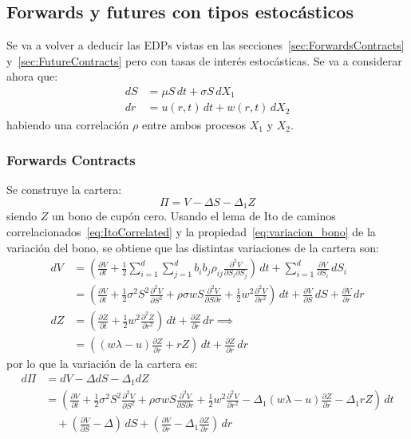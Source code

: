 \subsection{Forwards y futures con tipos estocásticos}
Se va a volver a deducir las EDPs vistas en las secciones~\ref{sec:ForwardsContracts} y~\ref{sec:FutureContracts} pero con tasas de interés estocásticas. Se va a considerar ahora que:
\begin{align*}
    dS &= \mu S\,dt + \sigma S\,dX_1 \\[1.5em]
    dr &= u(r,t)\,dt + w(r,t)\,dX_2
\end{align*}
habiendo una correlación $\rho$ entre ambos procesos $X_1$ y $X_2$.


\subsubsection{Forwards Contracts}
Se construye la cartera:
\begin{equation*}
    \Pi = V - \Delta S - \Delta_1 Z
\end{equation*}
siendo $Z$ un bono de cupón cero. Usando el lema de Ito de caminos correlacionados~\eqref{eq:ItoCorrelated} y la propiedad~\eqref{eq:variacion_bono} de la variación del bono, se obtiene que las distintas variaciones de la cartera son:
\begin{align*}
    dV &= \left( \frac{\partial V}{\partial t} + \frac{1}{2} \sum_{i=1}^{d} \sum_{j=1}^{d} b_i b_j \rho_{ij} \frac{\partial^2 V}{\partial S_i \partial S_j} \right)\,dt + \sum_{i=1}^{d} \frac{\partial V}{\partial S_i}\,dS_i \\
    &= \left( \frac{\partial V}{\partial t} + \frac{1}{2} \sigma^2 S^2 \frac{\partial^2 V}{\partial S^2} + \rho\sigma w S \frac{\partial^2 V}{\partial S \partial r} + \frac{1}{2} w^2 \frac{\partial^2 V}{\partial r^2} \right)\,dt + \frac{\partial V}{\partial S}\,dS + \frac{\partial V}{\partial r}\,dr \\
    dZ &= \left(\frac{\partial Z}{\partial t} + \frac{1}{2} w^2 \frac{\partial^2 Z}{\partial r^2}\right)\,dt + \frac{\partial Z}{\partial r}\,dr \implies \\
    &=  \left((w\lambda - u) \frac{\partial Z}{\partial r} + rZ\right)\,dt + \frac{\partial Z}{\partial r}\,dr
\end{align*}
por lo que la variación de la cartera es:
\begin{align*}
    d\Pi &= dV - \Delta dS - \Delta_1 dZ \\
    &= \left( \frac{\partial V}{\partial t} + \frac{1}{2} \sigma^2 S^2 \frac{\partial^2 V}{\partial S^2} + \rho\sigma w S \frac{\partial^2 V}{\partial S \partial r} + \frac{1}{2} w^2 \frac{\partial^2 V}{\partial r^2} - \Delta_1 (w\lambda - u) \frac{\partial Z}{\partial r} - \Delta_1 rZ  \right)\,dt \\
    &\quad + \left(\frac{\partial V}{\partial S} - \Delta\right)\,dS + \left( \frac{\partial V}{\partial r} - \Delta_1 \frac{\partial Z}{\partial r} \right)\,dr
\end{align*}
